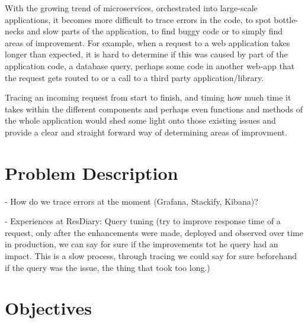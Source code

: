 \documentclass[11pt]{article}
\begin{document}
With the growing trend of microservices, orchestrated into large-scale applications, it becomes more difficult to trace errors in the code, to spot bottle-necks and slow parts of the application, to find buggy code or to simply find areas of improvement. For example, when a request to a web application takes longer than expected, it is hard to determine if this was caused by part of the application code, a database query, perhaps some code in another web-app that the request gets routed to or a call to a third party application/library.

Tracing an incoming request from start to finish, and timing how much time it takes within the different components and perhaps even functions and methods of the whole application would shed some light onto those existing issues and provide a clear and straight forward way of determining areas of improvment.

\section{Problem Description}


- How do we trace errors at the moment (Grafana, Stackify, Kibana)?

- Experiences at ResDiary: Query tuning (try to improve response time of a request, only after the enhancements were made, deployed and observed over time in production, we can say for sure if the improvements tot he query had an impact. This is a slow process, through tracing we could say for sure beforehand if the query was the issue, the thing that took too long.)

\section{Objectives} 

\end{document}
